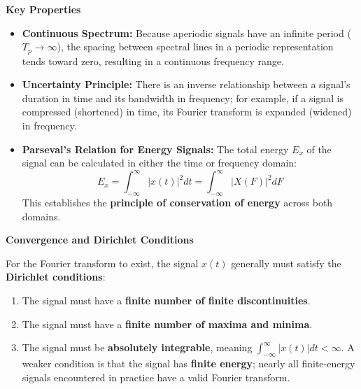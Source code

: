 \textbf{Key Properties}

\begin{itemize}
\tightlist
\item
  \textbf{Continuous Spectrum:} Because aperiodic signals have an
  infinite period (\(T_p \to \infty\)), the spacing between spectral
  lines in a periodic representation tends toward zero, resulting in a
  continuous frequency range.
\item
  \textbf{Uncertainty Principle:} There is an inverse relationship
  between a signal's duration in time and its bandwidth in frequency;
  for example, if a signal is compressed (shortened) in time, its
  Fourier transform is expanded (widened) in frequency.
\item
  \textbf{Parseval's Relation for Energy Signals:} The total energy
  \(E_x\) of the signal can be calculated in either the time or
  frequency domain:
  \[E_x = \int_{-\infty}^{\infty} |x(t)|^2 dt = \int_{-\infty}^{\infty} |X(F)|^2 dF\]
  This establishes the \textbf{principle of conservation of energy}
  across both domains.
\end{itemize}

\textbf{Convergence and Dirichlet Conditions}

For the Fourier transform to exist, the signal \(x(t)\) generally must
satisfy the \textbf{Dirichlet conditions}:

\begin{enumerate}
\def\labelenumi{\arabic{enumi}.}
\tightlist
\item
  The signal must have a \textbf{finite number of finite
  discontinuities}.
\item
  The signal must have a \textbf{finite number of maxima and minima}.
\item
  The signal must be \textbf{absolutely integrable}, meaning
  \(\int_{-\infty}^{\infty} |x(t)| dt < \infty\). A weaker condition is
  that the signal has \textbf{finite energy}; nearly all finite-energy
  signals encountered in practice have a valid Fourier transform.
\end{enumerate}

